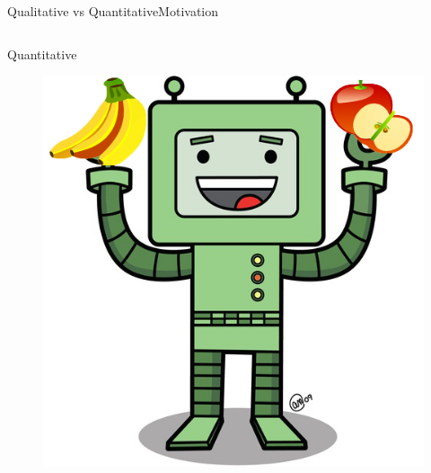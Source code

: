 \begin{frame}{Qualitative vs Quantitative}{Motivation}
\begin{columns}
\begin{block}{ Quantitative }
\begin{minipage}[t][5cm][t]{.9\textwidth}
\begin{figure}
	\centering
	\includegraphics[width=.6\linewidth]{figure/robot_preference}
\end{figure}
\end{minipage}

\end{block}

\end{columns}

\end{frame}

